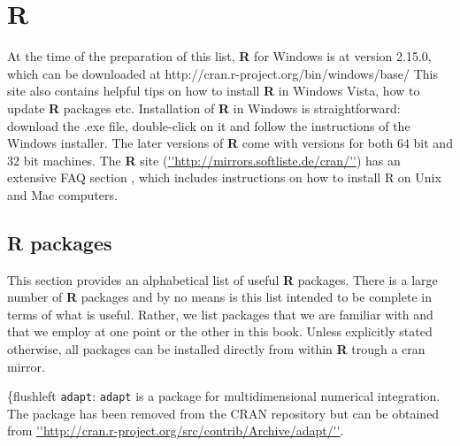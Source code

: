 \section{R}
At the time of the preparation of this list, {\bf R} for Windows is at version 2.15.0, which can be downloaded at http://cran.r-project.org/bin/windows/base/ 
This site also contains helpful tips on how to install {\bf R} in Windows Vista, how to update {\bf R} packages etc. 
Installation of {\bf R} in Windows is straightforward: download the .exe file, double-click on it and follow the instructions of the Windows installer. The later versions of {\bf R} come with versions for both 64 bit and 32 bit machines. 
The {\bf R} site (\url{''http://mirrors.softliste.de/cran/''}) has an extensive FAQ section \citet{hornik:2011}, which includes instructions on how to install R on Unix and Mac computers.  

\subsection{R packages}
This section provides an alphabetical list of useful {\bf R}  packages. There is a large number of {\bf R} packages and by no means is this list intended to be complete in terms of what is useful. Rather, we list packages that we are familiar with and that we employ at one point or the other in this book. Unless explicitly stated otherwise, all packages can be installed directly from within {\bf R} trough a cran mirror. 

 \{flushleft {{\tt adapt}: }
\mbox{\tt adapt} \citep{genz_etal:2007} is a package for multidimensional numerical integration.
The package has been removed from the CRAN repository but can be obtained from \url{''http://cran.r-project.org/src/contrib/Archive/adapt/''}.

